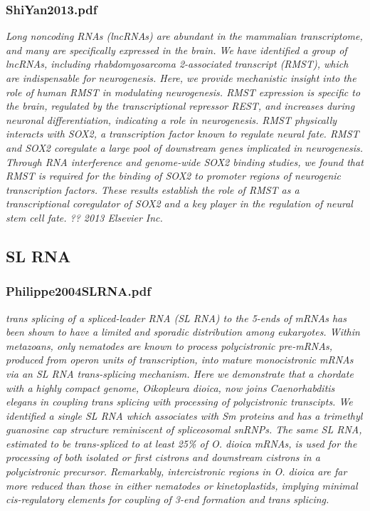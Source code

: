 \documentclass[graybox]{svmult}
\begin{document}
\subsubsection{ShiYan2013.pdf}
\cite{Ng2013}
\textit{Long noncoding RNAs (lncRNAs) are abundant in the mammalian transcriptome, and many are specifically expressed in the brain. We have identified a group of lncRNAs, including rhabdomyosarcoma 2-associated transcript (RMST), which are indispensable for neurogenesis. Here, we provide mechanistic insight into the role of human RMST in modulating neurogenesis. RMST expression is specific to the brain, regulated by the transcriptional repressor REST, and increases during neuronal differentiation, indicating a role in neurogenesis. RMST physically interacts with SOX2, a transcription factor known to regulate neural fate. RMST and SOX2 coregulate a large pool of downstream genes implicated in neurogenesis. Through RNA interference and genome-wide SOX2 binding studies, we found that RMST is required for the binding of SOX2 to promoter regions of neurogenic transcription factors. These results establish the role of RMST as a transcriptional coregulator of SOX2 and a key player in the regulation of neural stem cell fate. ?? 2013 Elsevier Inc.}

\subsection{SL RNA}
\subsubsection{Philippe2004SLRNA.pdf}
\cite{Ganot2004}
\textit{trans splicing of a spliced-leader RNA (SL RNA) to the 5-ends of mRNAs has been shown to have a limited
and sporadic distribution among eukaryotes. Within metazoans, only nematodes are known to process polycistronic
pre-mRNAs, produced from operon units of transcription, into mature monocistronic mRNAs via an
SL RNA trans-splicing mechanism. Here we demonstrate that a chordate with a highly compact genome,
Oikopleura dioica, now joins Caenorhabditis elegans in coupling trans splicing with processing of polycistronic
transcipts. We identified a single SL RNA which associates with Sm proteins and has a trimethyl guanosine
cap structure reminiscent of spliceosomal snRNPs. The same SL RNA, estimated to be trans-spliced to at least
25\% of O. dioica mRNAs, is used for the processing of both isolated or first cistrons and downstream cistrons
in a polycistronic precursor. Remarkably, intercistronic regions in O. dioica are far more reduced than those
in either nematodes or kinetoplastids, implying minimal cis-regulatory elements for coupling of 3-end formation
and trans splicing.}
\end{document}
